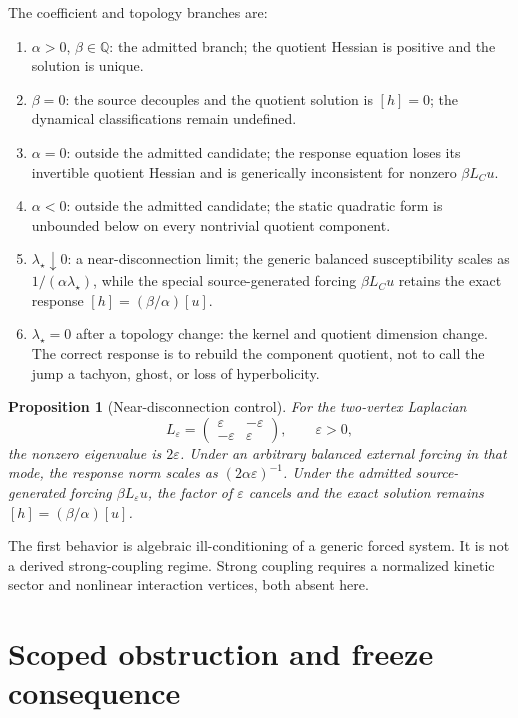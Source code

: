 \documentclass[11pt]{article}
\newtheorem{proposition}{Proposition}
\newcommand{\Q}{\mathbb Q}
\begin{document}
The coefficient and topology branches are:
\begin{enumerate}
 \item \(\alpha>0\), \(\beta\in\Q\): the admitted branch; the quotient
 Hessian is positive and the solution is unique.
 \item \(\beta=0\): the source decouples and the quotient solution is
 \([h]=0\); the dynamical classifications remain undefined.
 \item \(\alpha=0\): outside the admitted candidate; the response equation
 loses its invertible quotient Hessian and is generically inconsistent for
 nonzero \(\beta L_Cu\).
 \item \(\alpha<0\): outside the admitted candidate; the static quadratic
 form is unbounded below on every nontrivial quotient component.
 \item \(\lambda_\star\downarrow0\): a near-disconnection limit; the
 generic balanced susceptibility scales as
 \(1/(\alpha\lambda_\star)\), while the special source-generated forcing
 \(\beta L_Cu\) retains the exact response
 \([h]=(\beta/\alpha)[u]\).
 \item \(\lambda_\star=0\) after a topology change: the kernel and quotient
 dimension change.  The correct response is to rebuild the component
 quotient, not to call the jump a tachyon, ghost, or loss of
 hyperbolicity.
\end{enumerate}

\begin{proposition}[Near-disconnection control]
For the two-vertex Laplacian
\[
 L_\varepsilon=
 \begin{pmatrix}\varepsilon&-\varepsilon\\
 -\varepsilon&\varepsilon\end{pmatrix},
 \qquad \varepsilon>0,
\]
the nonzero eigenvalue is \(2\varepsilon\).  Under an arbitrary balanced
external forcing in that mode, the response norm scales as
\((2\alpha\varepsilon)^{-1}\).  Under the admitted source-generated
forcing \(\beta L_\varepsilon u\), the factor of \(\varepsilon\) cancels
and the exact solution remains
\([h]=(\beta/\alpha)[u]\).
\end{proposition}

The first behavior is algebraic ill-conditioning of a generic forced
system.  It is not a derived strong-coupling regime.  Strong coupling
requires a normalized kinetic sector and nonlinear interaction vertices,
both absent here.

\section{Scoped obstruction and freeze consequence}
\end{document}

